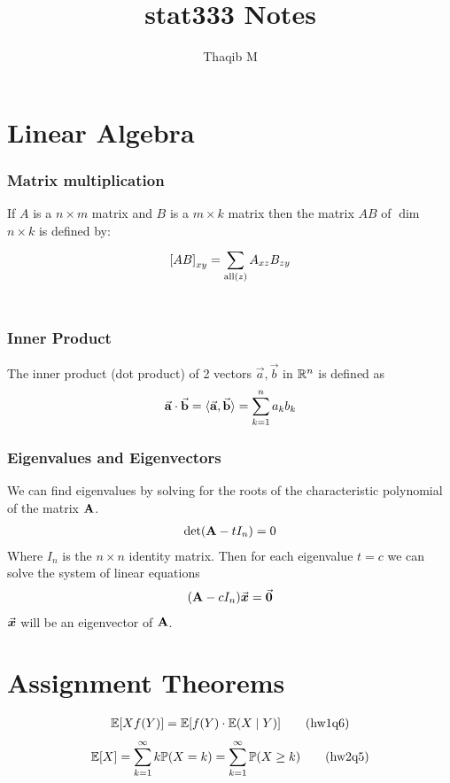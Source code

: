 \documentclass[12pt,a4paper]{article}
\author{Thaqib M}
\title{stat333 Notes}
\begin{document}
\maketitle
\newpage
\section*{Linear Algebra}
\subsubsection*{Matrix multiplication} If $A$ is a $n\times m$ matrix and $B$ is a $m\times k$ matrix then the matrix $AB$ of $\dim$ $n\times k$ is defined by: 
\begin{align*}
{\bf[}AB{\bf]}_{xy} = \sum\limits_{\mathrm{all}(z)}^{}A_{xz}B_{zy}
\end{align*}
\\
\subsubsection*{Inner Product} The inner product (dot product) of 2 vectors $\vec{a}, \vec{b}$ in $\mathbb{R}^n$ is defined as
\begin{align*}
\va{a}\cdot \va{b} = \langle\va{a},\va{b}\rangle = \sum\limits_{k=1}^{n}a_kb_k
\end{align*}
\subsubsection*{Eigenvalues and Eigenvectors}
We can find eigenvalues by solving for the roots of the characteristic polynomial of the matrix $\vb A$.
\begin{align*}
\det(\vb A-tI_n) = 0
\end{align*}
Where $I_n$ is the $n\times n$ identity matrix.
Then for each eigenvalue $t=c$ we can solve the system of linear equations 
\begin{align*}
(\vb A - cI_n)\va* x = \va* 0
\end{align*}
$\va* x$ will be an eigenvector of $\vb A$. 
\newpage
\section*{Assignment Theorems}
\begin{align*}
\mathbb{E}[Xf(Y)] = \mathbb{E}[f(Y)\cdot\mathbb{E}(X\;\vert\; Y)] \tag{hw1q6}
\end{align*}
\begin{align*}
\mathbb{E}[X] = \sum\limits_{k=1}^{\infty}k\mathbb{P}(X=k) = \sum\limits_{k=1}^{\infty} \mathbb{P}(X\geq k) \tag{hw2q5}
\end{align*}
\end{document}
